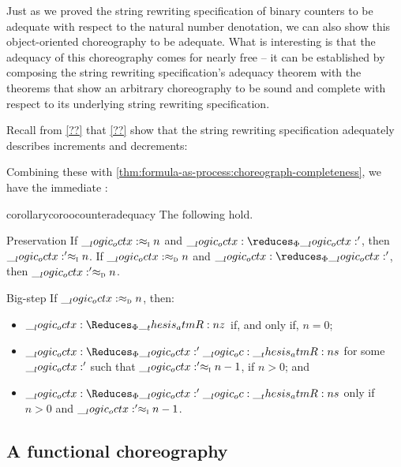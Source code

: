 Just as we proved the string rewriting specification of binary counters to be adequate with respect to the natural number denotation, we can also show this object-oriented choreography to be adequate.
What is interesting is that the adequacy of this choreography comes for nearly free -- it can be established by composing the string rewriting specification's adequacy theorem with the theorems that show an arbitrary choreography to be sound and complete with respect to its underlying string rewriting specification.




Recall from \cref{??} that \cref{??} show that the string rewriting specification adequately describes increments and decrements:
\thmadequacysmalldecstring*
%
\coradequacydecstring*

Combining these  with \cref{thm:formula-as-process:choreograph-completeness}, we have the immediate :
\begin{restatable}[
  name=Adequacy of object-oriented choreography,
  label=cor:choreographies:oo-counter-adequacy
]{corollary}{coroocounteradequacy}
  The following hold.
  \begin{thmdescription}
  \item[Preservation]
    If $\__logic_octx: \approx\sb{\text{\normalfont\scshape i}} n$ and $\octx \reduces_{\orsig} \octx'$, then $\__logic_octx:' \approx\sb{\text{\normalfont\scshape i}} n$.
    If $\__logic_octx: \approx\sb{\text{\normalfont\scshape d}} n$ and $\octx \reduces_{\orsig} \octx'$, then $\__logic_octx:' \approx\sb{\text{\normalfont\scshape d}} n$.

  \item[Big-step]
    If $\__logic_octx: \approx\sb{\text{\normalfont\scshape d}} n$, then:
    \begin{itemize}[nosep]
    \item $\octx \Reduces_{\orsig} \atmR{z}$ if, and only if, $n = 0$;
    \item $\octx \Reduces_{\orsig} \octx' \oc \atmR{s}$ for some $\__logic_octx:'$ such that $\__logic_octx:' \approx\sb{\text{\normalfont\scshape i}} n-1$, if $n > 0$; and
    \item $\octx \Reduces_{\orsig} \octx' \oc \atmR{s}$ only if $n > 0$ and $\__logic_octx:' \approx\sb{\text{\normalfont\scshape i}} n-1$.
    \end{itemize}
  \end{thmdescription}
\end{restatable}



\subsection{A functional choreography}

